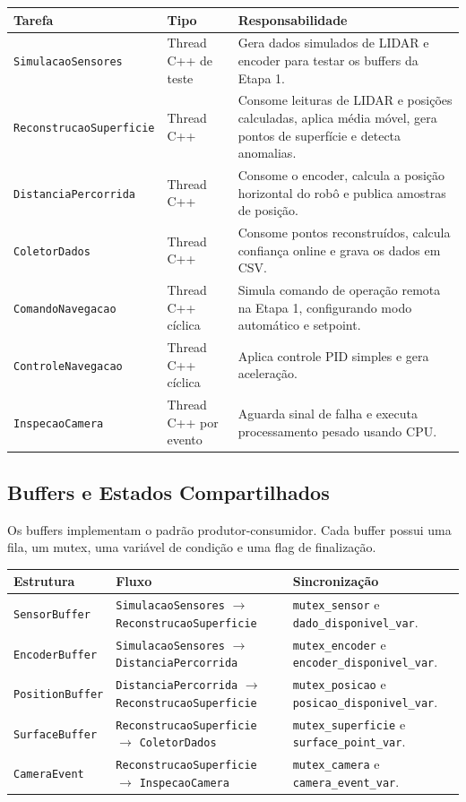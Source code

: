 \documentclass[12pt,a4paper]{article}
\begin{document}
    \begin{longtable}{p{4.8cm}p{3.3cm}p{5.9cm}}
    \toprule
    \textbf{Tarefa} & \textbf{Tipo} & \textbf{Responsabilidade} \\
    \midrule
    \endhead
    \texttt{SimulacaoSensores} & Thread C++ de teste & Gera dados simulados de LIDAR e encoder para testar os buffers da Etapa 1. \\
    \texttt{ReconstrucaoSuperficie} & Thread C++ & Consome leituras de LIDAR e posições calculadas, aplica média móvel, gera pontos de superfície e detecta anomalias. \\
    \texttt{DistanciaPercorrida} & Thread C++ & Consome o encoder, calcula a posição horizontal do robô e publica amostras de posição. \\
    \texttt{ColetorDados} & Thread C++ & Consome pontos reconstruídos, calcula confiança online e grava os dados em CSV. \\
    \texttt{ComandoNavegacao} & Thread C++ cíclica & Simula comando de operação remota na Etapa 1, configurando modo automático e setpoint. \\
    \texttt{ControleNavegacao} & Thread C++ cíclica & Aplica controle PID simples e gera aceleração. \\
    \texttt{InspecaoCamera} & Thread C++ por evento & Aguarda sinal de falha e executa processamento pesado usando CPU. \\
    \bottomrule
    \end{longtable}

    \subsection{Buffers e Estados Compartilhados}

    Os buffers implementam o padrão produtor-consumidor. Cada buffer possui uma fila, um mutex, uma variável de condição e uma flag de finalização.

    \begin{longtable}{p{3.5cm}p{5.3cm}p{5.4cm}}
    \toprule
    \textbf{Estrutura} & \textbf{Fluxo} & \textbf{Sincronização} \\
    \midrule
    \endhead
    \texttt{SensorBuffer} & \texttt{SimulacaoSensores} $\rightarrow$ \texttt{ReconstrucaoSuperficie} & \texttt{mutex\_sensor} e \texttt{dado\_disponivel\_var}. \\
    \texttt{EncoderBuffer} & \texttt{SimulacaoSensores} $\rightarrow$ \texttt{DistanciaPercorrida} & \texttt{mutex\_encoder} e \texttt{encoder\_disponivel\_var}. \\
    \texttt{PositionBuffer} & \texttt{DistanciaPercorrida} $\rightarrow$ \texttt{ReconstrucaoSuperficie} & \texttt{mutex\_posicao} e \texttt{posicao\_disponivel\_var}. \\
    \texttt{SurfaceBuffer} & \texttt{ReconstrucaoSuperficie} $\rightarrow$ \texttt{ColetorDados} & \texttt{mutex\_superficie} e \texttt{surface\_point\_var}. \\
    \texttt{CameraEvent} & \texttt{ReconstrucaoSuperficie} $\rightarrow$ \texttt{InspecaoCamera} & \texttt{mutex\_camera} e \texttt{camera\_event\_var}. \\
    \bottomrule
    \end{longtable}
\end{document}

